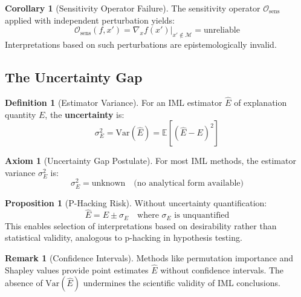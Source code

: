 \documentclass[11pt,a4paper]{article}
\theoremstyle{definition}
\newtheorem{definition}{Definition}[section]
\newtheorem{proposition}{Proposition}[section]
\newtheorem{corollary}{Corollary}[section]
\newtheorem{remark}{Remark}[section]
\newtheorem{axiom}{Axiom}[section]
\newcommand{\E}{\mathbb{E}}
\newcommand{\Var}{\mathrm{Var}}
\newcommand{\Osens}{\mathcal{O}_{\text{sens}}}
\newcommand{\Manifold}{\mathcal{M}}
\begin{document}
\begin{corollary}[Sensitivity Operator Failure]
The sensitivity operator $\Osens$ applied with independent perturbation yields:
\begin{equation}
\Osens(f, x') = \nabla_x f(x')|_{x' \notin \Manifold} = \text{unreliable}
\end{equation}
Interpretations based on such perturbations are epistemologically invalid.
\end{corollary}

\subsection{The Uncertainty Gap}

\begin{definition}[Estimator Variance]
For an IML estimator $\hat{E}$ of explanation quantity $E$, the \textbf{uncertainty} is:
\begin{equation}
\sigma^2_E = \Var(\hat{E}) = \E[(\hat{E} - E)^2]
\end{equation}
\end{definition}

\begin{axiom}[Uncertainty Gap Postulate]
For most IML methods, the estimator variance $\sigma^2_E$ is:
\begin{equation}
\boxed{\sigma^2_E = \text{unknown} \quad \text{(no analytical form available)}}
\end{equation}
\end{axiom}

\begin{proposition}[P-Hacking Risk]
Without uncertainty quantification:
\begin{equation}
\hat{E} = E \pm \sigma_E \quad \text{where } \sigma_E \text{ is unquantified}
\end{equation}
This enables selection of interpretations based on desirability rather than statistical validity, analogous to p-hacking in hypothesis testing.
\end{proposition}

\begin{remark}[Confidence Intervals]
Methods like permutation importance and Shapley values provide point estimates $\hat{E}$ without confidence intervals. The absence of $\Var(\hat{E})$ undermines the scientific validity of IML conclusions.
\end{remark}

\end{document}
